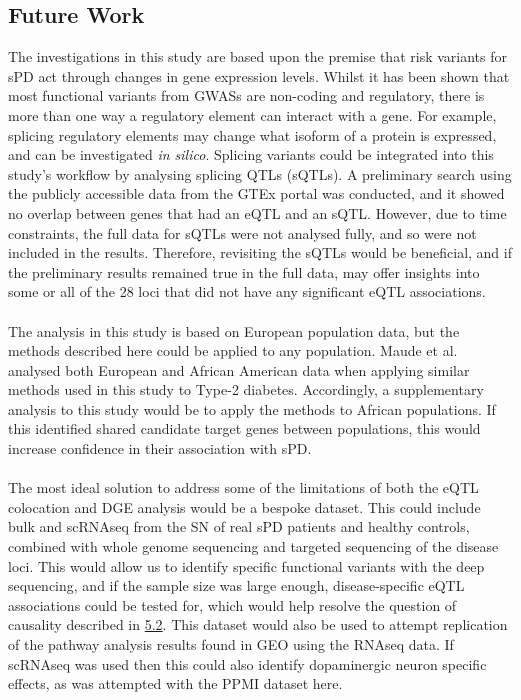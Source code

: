 \documentclass{article}
\begin{document}
\subsection{Future Work}
The investigations in this study are based upon the premise that risk variants for sPD act through changes in gene expression levels. Whilst it has been shown that most functional variants from GWASs are non-coding and regulatory\cite{Maurano2012SystematicDNA}, there is more than one way a regulatory element can interact with a gene. For example, splicing regulatory elements may change what isoform of a protein is expressed, and can be investigated \textit{in silico}\cite{Tubeuf2020LargescaleElements}. Splicing variants could be integrated into this study's workflow by analysing splicing QTLs (sQTLs). A preliminary search using the publicly accessible data from the GTEx portal\cite{Aguet2020TheTissues} was conducted, and it showed no overlap between genes that had an eQTL and an sQTL. However, due to time constraints, the full data for sQTLs were not analysed fully, and so were not included in the results. Therefore, revisiting the sQTLs would be beneficial, and if the preliminary results remained true in the full data, may offer insights into some or all of the 28 loci that did not have any significant eQTL associations.
\\
\\The analysis in this study is based on European population data, but the methods described here could be applied to any population. Maude et al.\cite{Maude2021NewDiabetes.} analysed both European and African American data when applying similar methods used in this study to Type-2 diabetes. Accordingly, a supplementary analysis to this study would be to apply the methods to African populations. If this identified shared candidate target genes between populations, this would increase confidence in their association with sPD. 
\\
\\The most ideal solution to address some of the limitations of both the eQTL colocation and DGE analysis would be a bespoke dataset. This could include bulk and scRNAseq from the SN of real sPD patients and healthy controls, combined with whole genome sequencing and targeted sequencing of the disease loci. This would allow us to identify specific functional variants with the deep sequencing, and if the sample size was large enough, disease-specific eQTL associations could be tested for, which would help resolve the question of causality described in \hyperref[subsubsec:causality]{5.2}. This dataset would also be used to attempt replication of the pathway analysis results found in GEO using the RNAseq data. If scRNAseq was used then this could also identify dopaminergic neuron specific effects, as was attempted with the PPMI dataset here. 
\newpage
\end{document}
